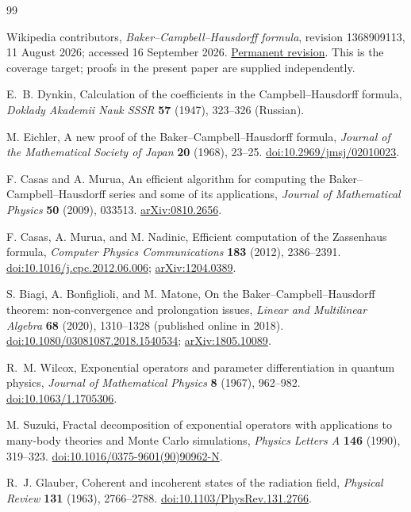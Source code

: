 \begingroup\small
\begin{thebibliography}{99}
\setlength{\itemsep}{3pt}
\setlength{\parskip}{0pt}

Wikipedia contributors,
\emph{Baker--Campbell--Hausdorff formula}, revision 1368909113,
11 August 2026; accessed 16 September 2026.
\href{https://en.wikipedia.org/w/index.php?oldid=1368909113&title=Baker%E2%80%93Campbell%E2%80%93Hausdorff_formula}{Permanent revision}.
This is the coverage target; proofs in the present paper are supplied independently.

E.~B. Dynkin,
Calculation of the coefficients in the Campbell--Hausdorff formula,
\emph{Doklady Akademii Nauk SSSR} \textbf{57} (1947), 323--326 (Russian).

M. Eichler,
A new proof of the Baker--Campbell--Hausdorff formula,
\emph{Journal of the Mathematical Society of Japan} \textbf{20} (1968), 23--25.
\href{https://doi.org/10.2969/jmsj/02010023}{doi:10.2969/jmsj/02010023}.

F. Casas and A. Murua,
An efficient algorithm for computing the Baker--Campbell--Hausdorff series and some of its applications,
\emph{Journal of Mathematical Physics} \textbf{50} (2009), 033513.
\href{https://arxiv.org/abs/0810.2656}{arXiv:0810.2656}.

F. Casas, A. Murua, and M. Nadinic,
Efficient computation of the Zassenhaus formula,
\emph{Computer Physics Communications} \textbf{183} (2012), 2386--2391.
\href{https://doi.org/10.1016/j.cpc.2012.06.006}{doi:10.1016/j.cpc.2012.06.006};
\href{https://arxiv.org/abs/1204.0389}{arXiv:1204.0389}.

S. Biagi, A. Bonfiglioli, and M. Matone,
On the Baker--Campbell--Hausdorff theorem: non-convergence and prolongation issues,
\emph{Linear and Multilinear Algebra} \textbf{68} (2020), 1310--1328
(published online in 2018).
\href{https://doi.org/10.1080/03081087.2018.1540534}{doi:10.1080/03081087.2018.1540534};
\href{https://arxiv.org/abs/1805.10089}{arXiv:1805.10089}.

R.~M. Wilcox,
Exponential operators and parameter differentiation in quantum physics,
\emph{Journal of Mathematical Physics} \textbf{8} (1967), 962--982.
\href{https://doi.org/10.1063/1.1705306}{doi:10.1063/1.1705306}.

M. Suzuki,
Fractal decomposition of exponential operators with applications to many-body theories and Monte Carlo simulations,
\emph{Physics Letters A} \textbf{146} (1990), 319--323.
\href{https://doi.org/10.1016/0375-9601(90)90962-N}{doi:10.1016/0375-9601(90)90962-N}.

R.~J. Glauber,
Coherent and incoherent states of the radiation field,
\emph{Physical Review} \textbf{131} (1963), 2766--2788.
\href{https://doi.org/10.1103/PhysRev.131.2766}{doi:10.1103/PhysRev.131.2766}.

\end{thebibliography}
\endgroup
